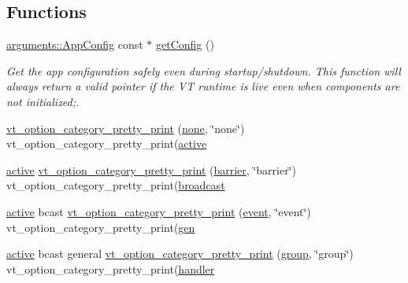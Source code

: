 \subsection*{Functions}
\begin{DoxyCompactItemize}
\item 
\hyperlink{structvt_1_1arguments_1_1_app_config}{arguments\+::\+App\+Config} const  $\ast$ \hyperlink{namespacevt_1_1config_a1074763aad1aa8a8e788a79e014fd82b}{get\+Config} ()
\begin{DoxyCompactList}\small\item\em Get the app configuration safely even during startup/shutdown. This function will always return a valid pointer if the VT runtime is live even when components are not initialized;. \end{DoxyCompactList}\item 
\hyperlink{namespacevt_1_1config_a449841f4d156e80bd15d6c6fdfa78790}{vt\+\_\+option\+\_\+category\+\_\+pretty\+\_\+print} (\hyperlink{namespacevt_1_1config_a6bd1d6215bda0d8ca02811798399f689a58436a9330bb7d9e28934e496ce96bfe}{none}, \char`\"{}none\char`\"{}) vt\+\_\+option\+\_\+category\+\_\+pretty\+\_\+print(\hyperlink{namespacevt_1_1config_a6bd1d6215bda0d8ca02811798399f689a82f77c67af0c363709010c6df4dbd920}{active}
\item 
\hyperlink{namespacevt_1_1config_a6bd1d6215bda0d8ca02811798399f689a82f77c67af0c363709010c6df4dbd920}{active} \hyperlink{namespacevt_1_1config_a089a9240dd41790f1dc100673b4ec409}{vt\+\_\+option\+\_\+category\+\_\+pretty\+\_\+print} (\hyperlink{namespacevt_1_1config_a6bd1d6215bda0d8ca02811798399f689a39d4d58fa73c76f6cb97e6dc20e0d1c0}{barrier}, \char`\"{}barrier\char`\"{}) vt\+\_\+option\+\_\+category\+\_\+pretty\+\_\+print(\hyperlink{namespacevt_1_1config_a6bd1d6215bda0d8ca02811798399f689a96457a80e68a41a3c6283126efe6200e}{broadcast}
\item 
\hyperlink{namespacevt_1_1config_a6bd1d6215bda0d8ca02811798399f689a82f77c67af0c363709010c6df4dbd920}{active} bcast \hyperlink{namespacevt_1_1config_adc18d97d304941c901a2d06015ac4624}{vt\+\_\+option\+\_\+category\+\_\+pretty\+\_\+print} (\hyperlink{namespacevt_1_1config_a6bd1d6215bda0d8ca02811798399f689a9e0b3f734ed730f6f3117f0687eda7df}{event}, \char`\"{}event\char`\"{}) vt\+\_\+option\+\_\+category\+\_\+pretty\+\_\+print(\hyperlink{namespacevt_1_1config_a6bd1d6215bda0d8ca02811798399f689a5b2fa777115f03c6d550ec721c0a93a5}{gen}
\item 
\hyperlink{namespacevt_1_1config_a6bd1d6215bda0d8ca02811798399f689a82f77c67af0c363709010c6df4dbd920}{active} bcast general \hyperlink{namespacevt_1_1config_a0f63a89d62d66caeff4d5b7a8a760eb1}{vt\+\_\+option\+\_\+category\+\_\+pretty\+\_\+print} (\hyperlink{namespacevt_1_1config_a6bd1d6215bda0d8ca02811798399f689a132506d2b8e888d0a91ae4470d4197c1}{group}, \char`\"{}group\char`\"{}) vt\+\_\+option\+\_\+category\+\_\+pretty\+\_\+print(\hyperlink{namespacevt_1_1config_a6bd1d6215bda0d8ca02811798399f689a82a0081a94d5c5dfd18b0b3f7eca64b7}{handler}

\end{DoxyCompactItemize}
